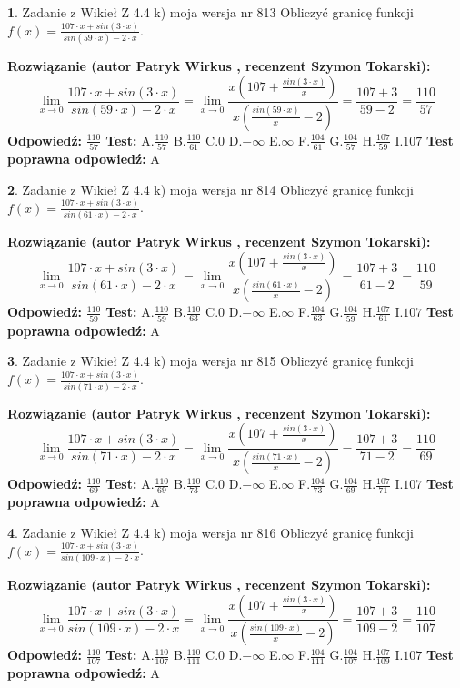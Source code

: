 \documentclass[12pt, a4paper]{article}
\theoremstyle{definition} %
\newtheorem{zad}{}
\newcommand{\zadStart}[1]{\begin{zad}#1\newline}
\newcommand{\zadStop}{\end{zad}}
\newcommand{\rozwStart}[2]{\noindent \textbf{Rozwiązanie (autor #1 , recenzent #2): }\newline}
\newcommand{\rozwStop}{\newline}
\newcommand{\odpStart}{\noindent \textbf{Odpowiedź:}\newline}
\newcommand{\odpStop}{\newline}
\newcommand{\testStart}{\noindent \textbf{Test:}\newline}
\newcommand{\testStop}{\newline}
\newcommand{\kluczStart}{\noindent \textbf{Test poprawna odpowiedź:}\newline}
\newcommand{\kluczStop}{\newline}
\begin{document}
\zadStart{Zadanie z Wikieł Z 4.4 k) moja wersja nr 813}
Obliczyć granicę funkcji $f(x)=\frac{107\cdot x +sin(3\cdot x)}{sin(59\cdot x) -2\cdot x}$.
\zadStop
\rozwStart{Patryk Wirkus}{Szymon Tokarski}
$$\lim\limits_{x\to 0}\frac{107\cdot x +sin(3\cdot x)}{sin(59\cdot x) -2\cdot x}
=\lim\limits_{x\to 0}\frac{x(107+\frac{sin(3\cdot x)}{x})}{x(\frac{sin(59\cdot x)}{x}-2)}
=\frac{107+3}{59-2} = \frac{110}{57}$$
\rozwStop
\odpStart
$\frac{110}{57}$
\odpStop
\testStart
A.$\frac{110}{57}$
B.$\frac{110}{61}$
C.$0$
D.$-\infty$
E.$\infty$
F.$\frac{104}{61}$
G.$\frac{104}{57}$
H.$\frac{107}{59}$
I.$107$
\testStop
\kluczStart
A
\kluczStop



\zadStart{Zadanie z Wikieł Z 4.4 k) moja wersja nr 814}
Obliczyć granicę funkcji $f(x)=\frac{107\cdot x +sin(3\cdot x)}{sin(61\cdot x) -2\cdot x}$.
\zadStop
\rozwStart{Patryk Wirkus}{Szymon Tokarski}
$$\lim\limits_{x\to 0}\frac{107\cdot x +sin(3\cdot x)}{sin(61\cdot x) -2\cdot x}
=\lim\limits_{x\to 0}\frac{x(107+\frac{sin(3\cdot x)}{x})}{x(\frac{sin(61\cdot x)}{x}-2)}
=\frac{107+3}{61-2} = \frac{110}{59}$$
\rozwStop
\odpStart
$\frac{110}{59}$
\odpStop
\testStart
A.$\frac{110}{59}$
B.$\frac{110}{63}$
C.$0$
D.$-\infty$
E.$\infty$
F.$\frac{104}{63}$
G.$\frac{104}{59}$
H.$\frac{107}{61}$
I.$107$
\testStop
\kluczStart
A
\kluczStop



\zadStart{Zadanie z Wikieł Z 4.4 k) moja wersja nr 815}
Obliczyć granicę funkcji $f(x)=\frac{107\cdot x +sin(3\cdot x)}{sin(71\cdot x) -2\cdot x}$.
\zadStop
\rozwStart{Patryk Wirkus}{Szymon Tokarski}
$$\lim\limits_{x\to 0}\frac{107\cdot x +sin(3\cdot x)}{sin(71\cdot x) -2\cdot x}
=\lim\limits_{x\to 0}\frac{x(107+\frac{sin(3\cdot x)}{x})}{x(\frac{sin(71\cdot x)}{x}-2)}
=\frac{107+3}{71-2} = \frac{110}{69}$$
\rozwStop
\odpStart
$\frac{110}{69}$
\odpStop
\testStart
A.$\frac{110}{69}$
B.$\frac{110}{73}$
C.$0$
D.$-\infty$
E.$\infty$
F.$\frac{104}{73}$
G.$\frac{104}{69}$
H.$\frac{107}{71}$
I.$107$
\testStop
\kluczStart
A
\kluczStop



\zadStart{Zadanie z Wikieł Z 4.4 k) moja wersja nr 816}
Obliczyć granicę funkcji $f(x)=\frac{107\cdot x +sin(3\cdot x)}{sin(109\cdot x) -2\cdot x}$.
\zadStop
\rozwStart{Patryk Wirkus}{Szymon Tokarski}
$$\lim\limits_{x\to 0}\frac{107\cdot x +sin(3\cdot x)}{sin(109\cdot x) -2\cdot x}
=\lim\limits_{x\to 0}\frac{x(107+\frac{sin(3\cdot x)}{x})}{x(\frac{sin(109\cdot x)}{x}-2)}
=\frac{107+3}{109-2} = \frac{110}{107}$$
\rozwStop
\odpStart
$\frac{110}{107}$
\odpStop
\testStart
A.$\frac{110}{107}$
B.$\frac{110}{111}$
C.$0$
D.$-\infty$
E.$\infty$
F.$\frac{104}{111}$
G.$\frac{104}{107}$
H.$\frac{107}{109}$
I.$107$
\testStop
\kluczStart
A
\kluczStop
\end{document}
